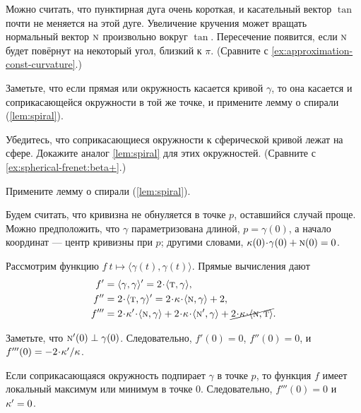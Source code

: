 \begin{multicols}{2}
Можно считать, что пунктирная дуга очень короткая, и касательный вектор $\tan$ почти не меняется на этой дуге. 
Увеличение кручения может вращать нормальный вектор $\text{\sc{n}}$ произвольно вокруг $\tan$.
Пересечение появится, если $\text{\sc{n}}$ будет повёрнут на некоторый угол, близкий к $\pi$.
(Сравните с \ref{ex:approximation-const-curvature}.)

Заметьте, что если прямая или окружность касается кривой $\gamma$, то она касается и соприкасающейся окружности в той же точке, и примените лемму о спирали (\ref{lem:spiral}).

Убедитесь, что соприкасающиеся окружности к сферической кривой лежат на сфере.
Докажите аналог \ref{lem:spiral} для этих окружностей.
(Сравните с \ref{ex:spherical-frenet:beta+}.)



\setcounter{eqtn}{0}

Примените лемму о спирали (\ref{lem:spiral}).

Будем считать, что кривизна не обнуляется в точке $p$, оставшийся случай проще.
Можно предположить, что $\gamma$ параметризована длиной, $p=\gamma(0)$, а начало координат --- центр кривизны при $p$;
другими словами, $\kur(0)\cdot\gamma(0)\z+ \norm(0)=0$.

Рассмотрим функцию $f\:t\mapsto \langle\gamma(t),\gamma(t)\rangle$.
Прямые вычисления дают 
\begin{align*}
f'
&=\langle\gamma,\gamma\rangle'
=2\cdot\langle\tan,\gamma\rangle,
\\
f''
&=2\cdot\langle\tan,\gamma\rangle'
=2\cdot\kur\cdot\langle\norm,\gamma\rangle+2,
\\
f'''
&=2\cdot\kur'\cdot\langle\norm,\gamma\rangle
+2\cdot\kur\cdot\langle\norm',\gamma\rangle+\cancel{2\cdot\kur\cdot\langle\norm,\tan\rangle}.
\end{align*}

Заметьте, что $\text{\sc{n}}'(0)\perp\gamma(0)$.
Следовательно, $f'(0)=0$, $f''(0)=0$, и $f'''(0)\z=-2\cdot\kur'/\kur$.

Если соприкасающаяся окружность подпирает $\gamma$ в точке $p$,
то функция $f$ имеет локальный максимум или минимум в точке $0$.
Следовательно, $f'''(0)=0$ и $\kappa'=0$.


\end{multicols}
